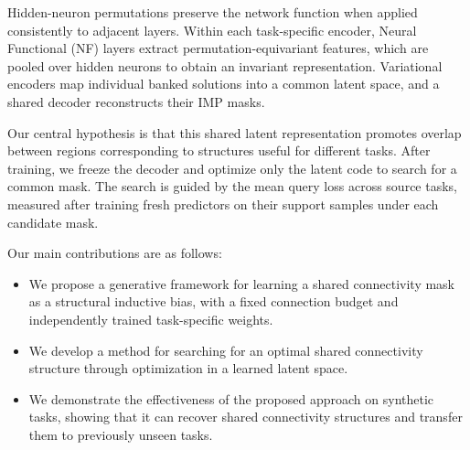 Hidden-neuron permutations preserve the network function when applied consistently to adjacent layers.
Within each task-specific encoder, Neural Functional (NF) layers \cite{zhou2023permutation} extract permutation-equivariant features, which are pooled over hidden neurons to obtain an invariant representation.
Variational encoders map individual banked solutions into a common latent space, and a shared decoder reconstructs their IMP masks.

Our central hypothesis is that this shared latent representation promotes overlap between regions corresponding to structures useful for different tasks.
After training, we freeze the decoder and optimize only the latent code to search for a common mask.
The search is guided by the mean query loss across source tasks, measured after training fresh predictors on their support samples under each candidate mask.

Our main contributions are as follows:
\begin{itemize}
    \item We propose a generative framework for learning a shared connectivity mask as a structural inductive bias, with a fixed connection budget and independently trained task-specific weights.
    \item We develop a method for searching for an optimal shared connectivity structure through optimization in a learned latent space.
    \item We demonstrate the effectiveness of the proposed approach on synthetic tasks, showing that it can recover shared connectivity structures and transfer them to previously unseen tasks.
\end{itemize}
